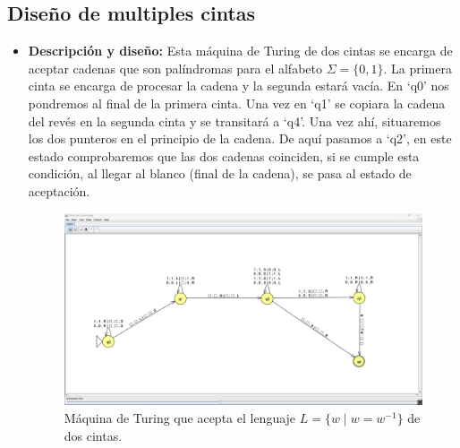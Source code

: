 \documentclass[11pt]{report}
\begin{document}
\subsection{Diseño de multiples cintas}
\begin{itemize}
  \item \textbf{Descripción y diseño:} Esta máquina de Turing de dos cintas se encarga de aceptar cadenas que son palíndromas para el alfabeto \(\Sigma = \{0, 1\}\). 
  La primera cinta se encarga de procesar la cadena y la segunda estará vacía. En ‘q0’ nos pondremos al final de la primera
  cinta. Una vez en ‘q1’ se copiara la cadena del revés en la segunda cinta y se transitará a
  ‘q4’. Una vez ahí, situaremos los dos punteros en el principio de la cadena. De aquí
  pasamos a ‘q2’, en este estado comprobaremos que las dos cadenas coinciden, si se
  cumple esta condición, al llegar al blanco (final de la cadena), se pasa al estado de
  aceptación.
  

        \begin{figure}[H]
          \centering
          \includegraphics[scale=0.3]{img/MT_04_multiple_ribbon.png}
          \caption{Máquina de Turing que acepta el lenguaje \(L = \{w \mid w = w^{-1}\}\) de dos cintas.}
          \label{fig:maquina de turing que acepta el lenguaje L = {w | w = w^{-1}} de dos cintas}
        \end{figure}

        \newpage


\end{itemize}
\end{document}

